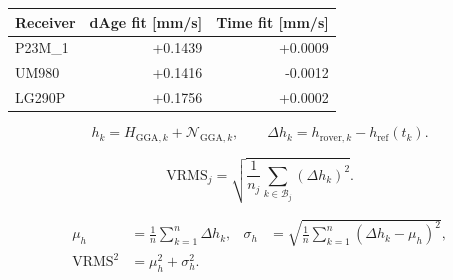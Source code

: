 \documentclass[11pt,a4paper]{article}
\numberwithin{equation}{section}
\numberwithin{figure}{section}
\begin{document}
\begin{center}\begin{lrbox}{\reporttable}\small\setlength{\tabcolsep}{4pt}\begin{tabular}{lrr}\toprule
Receiver & dAge fit [mm/\allowbreak{}s] & Time fit [mm/\allowbreak{}s]\\\midrule
P23M\_1 & +0.1439 & +0.0009\\
UM980 & +0.1416 & -0.0012\\
LG290P & +0.1756 & +0.0002\\
\bottomrule\end{tabular}\end{lrbox}\ifdim\wd\reporttable>\linewidth\resizebox{\linewidth}{!}{\usebox{\reporttable}}\else\usebox{\reporttable}\fi\end{center}

\begin{equation}h_k=H_{\mathrm{GGA},k}+\mathcal N_{\mathrm{GGA},k},\qquad \Delta h_k=h_{\mathrm{rover},k}-h_{\mathrm{ref}}(t_k).\label{eq:en-height}\end{equation}

\begin{equation}\mathrm{VRMS}_j=\sqrt{\frac{1}{n_j}\sum_{k\in\mathcal B_j}(\Delta h_k)^2}.\label{eq:en-vrms}\end{equation}

\begin{equation}\begin{aligned}\mu_h&=\frac{1}{n}\sum_{k=1}^{n}\Delta h_k,& \sigma_h&=\sqrt{\frac{1}{n}\sum_{k=1}^{n}(\Delta h_k-\mu_h)^2},\\ \mathrm{VRMS}^2&=\mu_h^2+\sigma_h^2.\end{aligned}\label{eq:en-bias}\end{equation}
\end{document}
